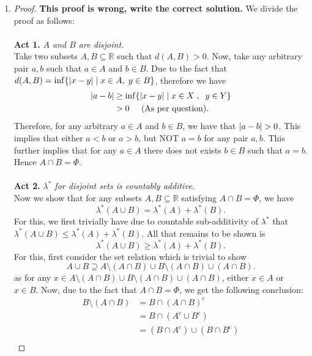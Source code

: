 \documentclass{article}
\theoremstyle{definition}
\theoremstyle{remark}
\theoremstyle{definition}
\theoremstyle{definition}
\theoremstyle{definition}
\DeclarePairedDelimiter\abs{\lvert}{\rvert}
\newcommand{\union}{\cup}
\newcommand{\intrs}{\cap}
\newcommand{\where}{\;\vert\;}
\newcommand{\R}{\mathbb{R}}
\newcommand{\comp}[1]{#1^{\text{c}}}
\newcommand{\lom}[1]{\lambda^*\left (#1\right )}
\begin{document}
\begin{enumerate}
{\begin{proof}
 \end{proof}}
\item {\begin{proof} \textbf{This proof is wrong, write the correct solution.} We divide the proof as follows:\\\\
		\textbf{Act 1.} \emph{$ A $ and $ B $ are disjoint.}\\
		Take two subsets $ A,B \subseteq \R $ such that $ d(A,B) >0 $. Now, take any arbitrary pair $ a,b $ such that $ a\in A $ and $ b\in B $. Due to the fact that $ d(A,B) = \inf \{\abs{x-y}\where x\in A, \;y\in B\}$, therefore we have
		\begin{equation*}
			\begin{split}
				\abs{a-b} &\ge \inf\{ \abs{x-y}\where x\in X\;,\;\;y\in Y\}\\
				&>0 \;\;\;\;\;(\text{As per question}).
			\end{split}
		\end{equation*}
	Therefore, for any arbitrary $ a\in A $ and $ b\in B $, we have that $ \abs{a-b} >0 $. This implies that either $ a < b $ or $ a > b $, but NOT $ a = b $ for any pair $ a,b$. This further implies that for any $ a\in A $ there does not exists $ b\in B $ such that $ a=b $. Hence $ A \intrs B  = \Phi$. \\\\
	\textbf{Act 2.} \emph{$ \lambda^* $ for disjoint sets is countably additive.}\\
	Now we show that for any subsets $ A, B\subseteq \R $ satisfying $ A\intrs B =\Phi $, we have
	\[\lom{A\union B} = \lom{A} + \lom{B}.\]
	For this, we first trivially have due to countable sub-additivity of $ \lambda^* $ that $ \lom{A \union B} \le \lom{A} + \lom{B} $. All that remains to be shown is 
	\[\lom{A\union B}\ge \lom{A} + \lom{B}.\]
	For this, first consider the set relation which is trivial to show
	\[A\union B \supseteq A\setminus (A\intrs B) \union B\setminus (A\intrs B) \union (A\intrs B).\]
	as for any $ x\in A\setminus (A\intrs B) \union B\setminus (A\intrs B) \union (A\intrs B) $, either $ x\in A $ or $ x\in B $. Now, due to the fact that $ A\intrs B = \Phi $, we get the following conclusion:
	\begin{equation*}
		\begin{split}
			 B\setminus (A\intrs B) &= B\intrs \comp{(A\intrs B)}\\
			 &= B\intrs (\comp{A} \union \comp{B})\\
			 &= (B\intrs \comp{A}) \union (B\intrs \comp{B})\\

\end{split}
\end{equation*}
\end{proof}}
\end{enumerate}
\end{document}
